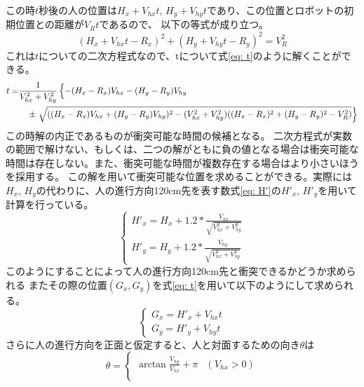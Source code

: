 \documentclass{kuisthesis}
\begin{document}
\begin{itemize}
\begin{table}[H]
\end{table}
この時$t$秒後の人の位置は$H_x + V_{hx}t$, $H_y + V_{hy}t$であり、この位置とロボットの初期位置との距離が$V_Rt$であるので、
以下の等式が成り立つ。\begin{equation}(H_x + V_{hx}t - R_x)^{2} + (H_y + V_{hy}t - R_y)^2 = V_R^2\end{equation}
これは$t$についての二次方程式なので、tについて式\ref{eq: t}のように解くことができる。
\scriptsize
\begin{equation}
  \label{eq: t}
  \begin{split}
  t = &\frac{1}{V_{hx}^2 + V_{hy}^2}\left\{-(H_x - R_x)V_{hx} - (H_y - R_y)V_{hy} \color{white}\sqrt{(a +(c+ b))}\color{black}\right. \\
  &  \quad \pm \left. \sqrt{((H_x - R_x)V_{hx} + (H_y - R_y)V_{hy})^2 - (V_{hx}^2 + V_{hy}^2)((H_x - R_x)^2 + (H_y - R_y)^2 - V_R^2)}\right\} 
  \end{split}
\end{equation}
\normalsize
この時解の内正であるものが衝突可能な時間の候補となる。
二次方程式が実数の範囲で解けない、もしくは、二つの解がともに負の値となる場合は衝突可能な時間は存在しない。また、衝突可能な時間が複数存在する場合はより小さいほうを採用する。
この解を用いて衝突可能な位置を求めることができる。実際には$H_x$, $H_y$の代わりに、人の進行方向120cm先を表す数式\ref{eq: H'}の$H'_x$, $H'_y$を用いて計算を行っている。
\begin{equation}
  \label{eq: H'}
\left\{\begin{array}{l}
H'_x = H_x + 1.2*\frac{V_{hx}}{\sqrt{{V_{hx}^2 + V_{hy}^2}}}\\
H'_y = H_y + 1.2 * \frac{V_{hy}}{\sqrt{V_{hx}^2 + V_{hy}^2}}
\end{array}\right.
\end{equation}
このようにすることによって人の進行方向120cm先と衝突できるかどうか求められる
またその際の位置$(G_x, G_y)$を式\ref{eq: t}を用いて以下のようにして求められる。
\begin{equation}
  \label{eq: G}
\left\{\begin{array}{l}
G_x = H'_x + V_{hx}t\\
G_y = H'_y + V_{hy}t
\end{array}\right.
\end{equation}
さらに人の進行方向を正面と仮定すると、人と対面するための向き$\theta$は\\
\begin{equation}
  \label{eq: theta}
  \theta = 
  \begin{cases}
    \arctan{\frac{V_{hy}}{V_{hx}}}  + \pi & (V_{hx} > 0)\\

\end{cases}
\end{equation}
\end{itemize}
\end{document}
